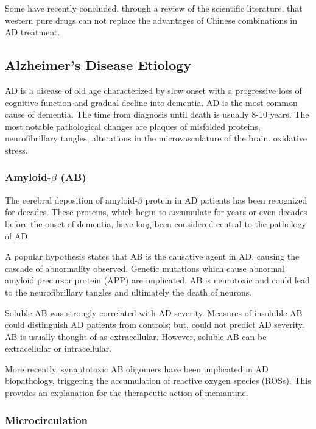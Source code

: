 \documentclass[twocolumn]{article}
\begin{document}
Some have recently concluded,
through a review of the scientific literature,
that western pure drugs
can not replace the advantages of Chinese combinations
in AD treatment.
\cite{su2014treatment}




\subsection{Alzheimer's Disease Etiology}

AD is a disease of old age
characterized by slow onset with a
progressive loss of cognitive function and gradual decline into dementia.
AD is the most common cause of dementia.
The time from diagnosis until death is usually 8-10 years.
The most notable pathological changes are plaques of misfolded proteins,
neurofibrillary tangles, alterations in the microvasculature of the brain.
oxidative stress.

\subsubsection{Amyloid-$\beta$ (AB)}

The cerebral deposition of amyloid-$\beta$ protein in AD patients
has been recognized for decades.
These proteins, which begin to accumulate
for years or even decades before the onset of dementia,
 have long been considered central to the pathology of AD.
\cite{citron1992mutation}

A popular hypothesis states that AB is the causative agent in AD,
causing the cascade of abnormality observed. Genetic mutations
which cause abnormal amyloid precursor protein (APP) are implicated.
AB is neurotoxic and could lead to the neurofibrillary tangles
and ultimately the death of neurons.
\cite{hardy1992alzheimer}


Soluble AB was strongly correlated with AD severity.
Measures of insoluble AB could distinguish AD patients from
controls; but, could not predict AD severity.
AB is usually thought of as extracellular.
However, soluble AB can be extracellular or intracellular.
\cite{mclean1999soluble}


More recently, synaptotoxic AB oligomers have been implicated
in AD biopathology,
triggering the accumulation of reactive oxygen species (ROSs).
This provides an explanation for the therapeutic action
of memantine.
\cite{klein2013synaptotoxic}



\subsubsection{Microcirculation}
\end{document}
